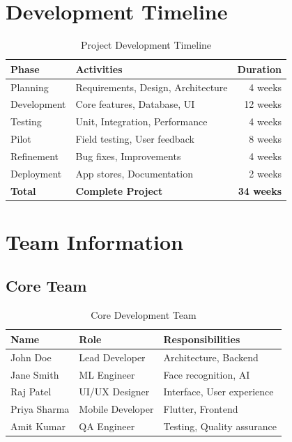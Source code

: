 \documentclass[12pt,a4paper]{article}
\begin{document}
\section{Development Timeline}
\begin{table}[H]
\centering
\small
\begin{tabularx}{\textwidth}{|l|X|r|}
\hline
\rowcolor{lightgray}
\textbf{Phase} & \textbf{Activities} & \textbf{Duration} \\
\hline
Planning & Requirements, Design, Architecture & 4 weeks \\
\hline
Development & Core features, Database, UI & 12 weeks \\
\hline
Testing & Unit, Integration, Performance & 4 weeks \\
\hline
Pilot & Field testing, User feedback & 8 weeks \\
\hline
Refinement & Bug fixes, Improvements & 4 weeks \\
\hline
Deployment & App stores, Documentation & 2 weeks \\
\hline
\textbf{Total} & \textbf{Complete Project} & \textbf{34 weeks} \\
\hline
\end{tabularx}
\caption{Project Development Timeline}
\end{table}

\section{Team Information}

\subsection{Core Team}
\begin{table}[H]
\centering
\small
\begin{tabularx}{\textwidth}{|l|X|X|}
\hline
\rowcolor{lightgray}
\textbf{Name} & \textbf{Role} & \textbf{Responsibilities} \\
\hline
John Doe & Lead Developer & Architecture, Backend \\
\hline
Jane Smith & ML Engineer & Face recognition, AI \\
\hline
Raj Patel & UI/UX Designer & Interface, User experience \\
\hline
Priya Sharma & Mobile Developer & Flutter, Frontend \\
\hline
Amit Kumar & QA Engineer & Testing, Quality assurance \\
\hline
\end{tabularx}
\caption{Core Development Team}
\end{table}
\end{document}
